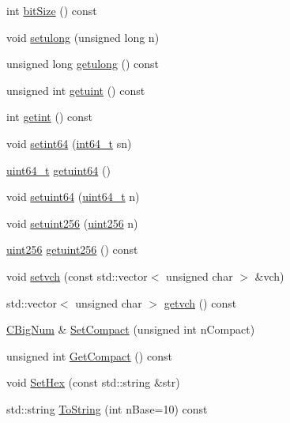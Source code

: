 \begin{DoxyCompactItemize}
\item 
int \hyperlink{class_c_big_num_acd423cb3d3249c8448e9c7a7f2e0d6bc}{bit\+Size} () const 
\item 
void \hyperlink{class_c_big_num_ac8c00c696d9cbd3fa309a2d0a6bc4b1d}{setulong} (unsigned long n)
\item 
unsigned long \hyperlink{class_c_big_num_a48b83ff7e74140b0b7e0a4ecee4fde78}{getulong} () const 
\item 
unsigned int \hyperlink{class_c_big_num_a52ccd774492092c2ae19f256b9eaf025}{getuint} () const 
\item 
int \hyperlink{class_c_big_num_a6cc21efc13d985c53104d48665bec019}{getint} () const 
\item 
void \hyperlink{class_c_big_num_aca73fa36a797c91b30515ae61cc5d765}{setint64} (\hyperlink{stdint_8h_adec1df1b8b51cb32b77e5b86fff46471}{int64\+\_\+t} sn)
\item 
\hyperlink{stdint_8h_aaa5d1cd013383c889537491c3cfd9aad}{uint64\+\_\+t} \hyperlink{class_c_big_num_a2cc30d131f0ef727d0ba21f964158b2b}{getuint64} ()
\item 
void \hyperlink{class_c_big_num_ae61a86bfe3b286a2cfda45ffba1c1310}{setuint64} (\hyperlink{stdint_8h_aaa5d1cd013383c889537491c3cfd9aad}{uint64\+\_\+t} n)
\item 
void \hyperlink{class_c_big_num_ade94c52f2f5d5a20e605125fcf727a34}{setuint256} (\hyperlink{classuint256}{uint256} n)
\item 
\hyperlink{classuint256}{uint256} \hyperlink{class_c_big_num_ad17ff84ee557ca5ad4b854e14d08099f}{getuint256} () const 
\item 
void \hyperlink{class_c_big_num_aa9236c14e34519e9b173a9a4b80f5621}{setvch} (const std\+::vector$<$ unsigned char $>$ \&vch)
\item 
std\+::vector$<$ unsigned char $>$ \hyperlink{class_c_big_num_aa0660ea2e5c401414f052ee14f6ea896}{getvch} () const 
\item 
\hyperlink{class_c_big_num}{C\+Big\+Num} \& \hyperlink{class_c_big_num_a27e3ca82a40ae0c34ac4c059e4d0d66c}{Set\+Compact} (unsigned int n\+Compact)
\item 
unsigned int \hyperlink{class_c_big_num_a26b88c1b29f347219907979ff2028bdc}{Get\+Compact} () const 
\item 
void \hyperlink{class_c_big_num_a9d4f7c42f141e45410af96e6804c54fe}{Set\+Hex} (const std\+::string \&str)
\item 
std\+::string \hyperlink{class_c_big_num_adca0fa61568497152375328deef6c895}{To\+String} (int n\+Base=10) const 
\item 

\end{DoxyCompactItemize}

